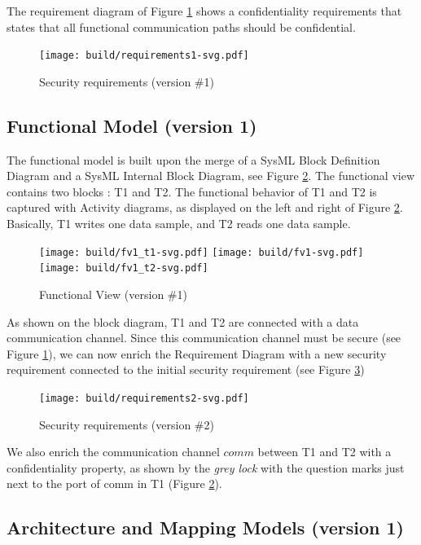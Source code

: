 \documentclass[12pt]{article}
\begin{document}
The requirement diagram of Figure \ref{fig:req1} shows a confidentiality requirements that states that all functional communication paths should be confidential.

\begin{figure}[htbp]
\centering
\texttt{[image: build/requirements1-svg.pdf]}
\caption{Security requirements (version \#1)} \label{fig:req1}
\end{figure}

\subsection{Functional Model (version 1)}
The functional model is built upon the merge of a  SysML Block Definition Diagram and a SysML Internal Block Diagram, see Figure \ref{fig:fv1}. The functional view contains two blocks : T1 and T2.  The functional behavior of T1 and T2 is captured with Activity diagrams, as displayed on the left and right of Figure \ref{fig:fv1}. Basically, T1 writes one data sample, and T2 reads one data sample.


\begin{figure}[htbp]
\centering
\texttt{[image: build/fv1\_t1-svg.pdf]}
\texttt{[image: build/fv1-svg.pdf]}
\texttt{[image: build/fv1\_t2-svg.pdf]}
\caption{Functional View (version \#1)} \label{fig:fv1}
\end{figure}

As shown on the block diagram, T1 and T2 are connected with a data communication channel. Since this communication channel must be secure (see Figure \ref{fig:req1}), we can now enrich the Requirement Diagram with a new security requirement connected to the initial security requirement (see Figure \ref{fig:req2})

\begin{figure}[htbp]
\centering
\texttt{[image: build/requirements2-svg.pdf]}
\caption{Security requirements (version \#2)} \label{fig:req2}
\end{figure}

We also enrich the communication channel $comm$ between T1 and T2 with a confidentiality property, as shown by the \textit{grey lock} with the question marks just next to the port of comm in T1 (Figure \ref{fig:fv1}).

\subsection{Architecture and Mapping Models (version 1)}
\end{document}

